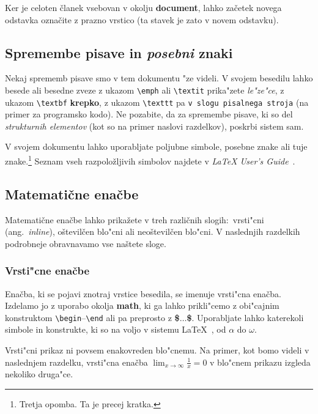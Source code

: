 \documentclass[sigconf,nonacm]{acmart}
\begin{document}
Ker je celoten članek vsebovan v okolju \textbf{document}, lahko začetek
novega odstavka označite z prazno vrstico (ta stavek je zato v novem odstavku).

\subsection{Spremembe pisave in \emph{posebni} znaki}

Nekaj sprememb pisave smo v tem dokumentu "ze videli.  V svojem besedilu lahko
besede ali besedne zveze z ukazom \texttt{\textbackslash{}emph} ali
\texttt{\textbackslash{}textit} prika"zete \emph{le"ze"ce}, z ukazom
\texttt{\textbackslash{}textbf} \textbf{krepko}, z ukazom
\texttt{\textbackslash{}texttt} pa \texttt{v slogu pisalnega stroja} (na
primer za programsko kodo).  Ne pozabite, da za spremembe pisave, ki so del
\emph{strukturnih elementov} (kot so na primer naslovi razdelkov), poskrbi
sistem sam.

V svojem dokumentu lahko uporabljate poljubne simbole, posebne znake
ali tuje znake.\footnote{Tretja opomba. Ta je precej kratka.} Seznam vseh
razpoložljivih simbolov najdete v \emph{\LaTeX{} User's
Guide}~\cite{Lamport:LaTeX}.

\subsection{Matematične enačbe}

Matematične enačbe lahko prikažete v treh različnih slogih:\ vrsti"cni (ang.\
\emph{inline}), oštevilčen blo"cni ali neoštevilčen blo"cni.  V naslednjih
razdelkih podrobneje obravnavamo vse naštete sloge.

\subsubsection{Vrsti"cne enačbe}

Enačba, ki se pojavi znotraj vrstice besedila, se imenuje vrsti"cna enačba.
Izdelamo jo z uporabo okolja \textbf{math}, ki ga lahko prikli"cemo z
obi"cajnim konstruktom
\texttt{\textbackslash{}begin}--\texttt{\textbackslash{}end} ali pa preprosto
z \textbf{\$$\ldots$\$}.  Uporabljate lahko katerekoli simbole in konstrukte,
ki so na voljo v sistemu \LaTeX~\cite{Lamport:LaTeX}, od $\alpha$ do $\omega$.

Vrsti"cni prikaz ni povsem enakovreden blo"cnemu. Na primer, kot bomo videli
v naslednjem razdelku, vrsti"cna enačba
\begin{math}\lim_{x\rightarrow \infty}\frac{1}{x}=0\end{math} 
v blo"cnem prikazu izgleda nekoliko druga"ce.
\end{document}
